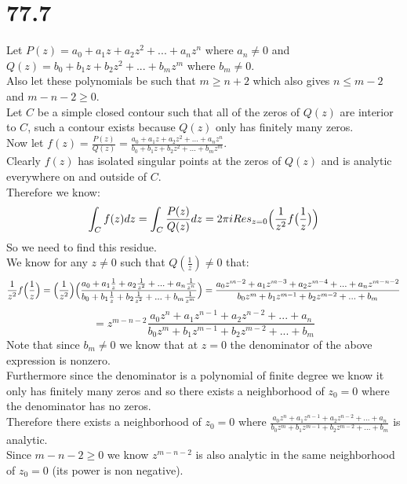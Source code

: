 \documentclass{article}
\begin{document}
\section*{77.7}
\begin{center}
    \doublespacing
    Let $P(z) = a_0 + a_1 z + a_2 z^2 + ... + a_n z^n$ where $a_n\neq 0$ and $Q(z) = b_0 + b_1 z + b_2 z^2 + ... + b_m z^m$ where $b_m\neq 0$.
    \\Also let these polynomials be such that $m\geq n + 2$ which also gives $n\leq m - 2$ and $m - n - 2\geq 0$.
    \\Let $C$ be a simple closed contour such that all of the zeros of $Q(z)$ are interior to $C$, such a contour exists because $Q(z)$ only has finitely many zeros.
    \\Now let $f(z) =\frac{P(z)}{Q(z)} =\frac{a_0 + a_1 z + a_2 z^2 + ... + a_n z^n}{b_0 + b_1 z + b_2 z^2 + ... + b_m z^m}$.
    \\Clearly $f(z)$ has isolated singular points at the zeros of $Q(z)$ and is analytic everywhere on and outside of $C$.
    \\Therefore we know:
    \[\int _C f(z) dz =\int _C\frac{P(z)}{Q(z)} dz = 2\pi i Res_{z=0}\Big{(}\frac{1}{z^2} f\big{(}\frac{1}{z}\big{)}\Big{)}\]
    So we need to find this residue.
    \\We know for any $z\neq 0$ such that $Q(\frac{1}{z})\neq 0$ that:
    \[\frac{1}{z^2}f\Big{(}\frac{1}{z}\Big{)} =\Big{(}\frac{1}{z^2}\Big{)}\Big{(}\frac{a_0 + a_1\frac{1}{z} + a_2\frac{1}{z^2} + ... + a_n\frac{1}{z^n}}{b_0 + b_1\frac{1}{z} + b_2\frac{1}{z^2} + ... + b_m\frac{1}{z^m}}\Big{)} =\frac{a_0 z^{m-2} + a_1 z^{m-3} + a_2 z^{m-4} + ... + a_n z^{m-n-2}}{b_0 z^m + b_1 z^{m-1} + b_2 z^{m-2} + ... + b_m}\]
    \[= z^{m-n-2}\frac{a_0 z^{n} + a_1 z^{n-1} + a_2 z^{n-2} + ... + a_n}{b_0 z^m + b_1 z^{m-1} + b_2 z^{m-2} + ... + b_m}\]
    Note that since $b_m\neq 0$ we know that at $z = 0$ the denominator of the above expression is nonzero.
    \\Furthermore since the denominator is a polynomial of finite degree we know it only has finitely many zeros and so there exists a neighborhood of $z_0 = 0$ where the denominator has no zeros.
    \\Therefore there exists a neighborhood of $z_0 = 0$ where $\frac{a_0 z^{n} + a_1 z^{n-1} + a_2 z^{n-2} + ... + a_n}{b_0 z^m + b_1 z^{m-1} + b_2 z^{m-2} + ... + b_m}$ is analytic.
    \\Since $m-n-2\geq 0$ we know $z^{m-n-2}$ is also analytic in the same neighborhood of $z_0 = 0$ (its power is non negative).

\end{center}
\end{document}
